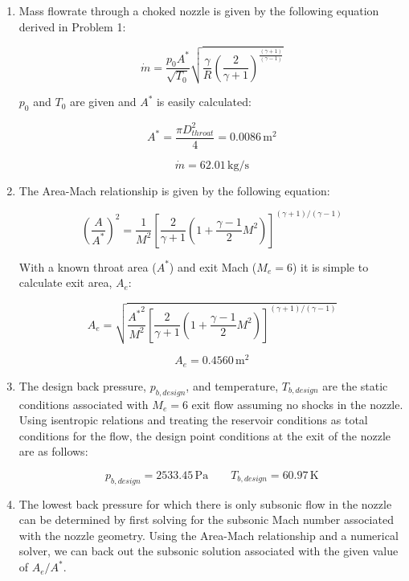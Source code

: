 \documentclass[../main.tex]{subfiles}
\begin{document}
\begin{enumerate}[label=(\alph*)]

    \item Mass flowrate through a choked nozzle is given by the following equation derived in Problem 1:
    
    \[
        \dot{m} = \frac{p_0 A^*}{\sqrt{T_0}} \sqrt{\frac{\gamma}{R} \left({\frac{2}{\gamma+1}}\right)^{\frac{(\gamma+1)}{(\gamma-1)}}}
    \]

    \(p_0\) and \(T_0\) are given and \(A^*\) is easily calculated:

    \[
        A^* = \frac{\pi D_{throat}^2}{4} =  0.0086 \, \unit{\meter\squared}
    \]

    \[
        \boxed{
        \dot{m} = 62.01 \,\unit{\kilogram/\second}
        }
    \]

    \item The Area-Mach relationship is given by the following equation:
    
    \[
        {\left({\frac{A}{A^*}}\right)}^2
        =
        \frac{1}{M^2}
        {\left[{
            \frac{2}{\gamma+1}
            \left({1 + \frac{\gamma-1}{2}M^2}\right)
        }\right]}^{(\gamma+1)/(\gamma-1)}
    \]

    With a known throat area (\(A^*\)) and exit Mach (\(M_e=6\)) it is simple to calculate exit area, \(A_e\):

    \[
        A_e
        =
        \sqrt{
        \frac{{A^*}^2}{M^2}
        {\left[{
            \frac{2}{\gamma+1}
            \left({1 + \frac{\gamma-1}{2}M^2}\right)
        }\right]}^{(\gamma+1)/(\gamma-1)}
        }
    \]

    \[
        \boxed{A_e =  0.4560\,\unit{\meter\squared}}
    \]

    \item The design back pressure, \(p_{b,design}\), and temperature, \(T_{b,design}\) are the static conditions associated with \(M_e=6\) exit flow assuming no shocks in the nozzle.
    Using isentropic relations and treating the reservoir conditions as total conditions for the flow, the design point conditions at the exit of the nozzle are as follows:

    \[
        \boxed{p_{b,design} = 2533.45\,\unit{\pascal} \qquad T_{b,design} = 60.97\,\unit{\kelvin}}
    \]    
    
    \item The lowest back pressure for which there is only subsonic flow in the nozzle can be determined by first solving for the subsonic Mach number associated with the nozzle geometry.
    Using the Area-Mach relationship and a numerical solver, we can back out the subsonic solution associated with the given value of \(A_e/A^*\).  


\end{enumerate}
\end{document}
